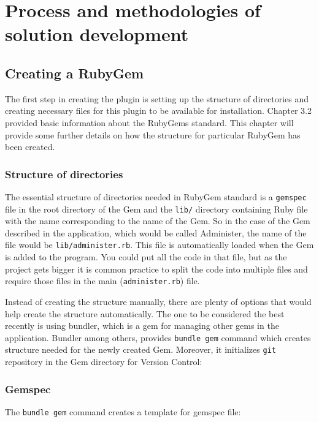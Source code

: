 \nocite{rspec}
\nocite{testing}
\nocite{agile}

\chapter{Process and methodologies of solution development}
  \section{Creating a RubyGem}
    The first step in creating the plugin is setting up the structure of directories and creating necessary
    files for this plugin to be available for installation. Chapter 3.2 provided basic information about
    the RubyGems standard. This chapter will provide some further details on how the structure for particular
    RubyGem has been created.

    \subsection{Structure of directories}
      The essential structure of directories needed in RubyGem standard is a \texttt{gemspec} file in the
      root directory of the Gem and the \texttt{lib/} directory containing Ruby file with the name
      corresponding to the name of the Gem. So in the case of the Gem described in the application,
      which would be called Administer, the name of the file would be \texttt{lib/administer.rb}. This
      file is automatically loaded when the Gem is added to the program. You could put all the code
      in that file, but as the project gets bigger it is common practice to split the code into multiple
      files and require those files in the main (\texttt{administer.rb}) file.

      Instead of creating the structure manually, there are plenty of options that would help create
      the structure automatically. The one to be considered the best recently is using bundler, which is
      a gem for managing other gems in the application. Bundler among others, provides \texttt{bundle gem}
      command which creates structure needed for the newly created Gem. Moreover, it initializes \texttt{git}
      repository in the Gem directory for Version Control:

      

    \subsection{Gemspec}
      The \texttt{bundle gem} command creates a template for gemspec file:

